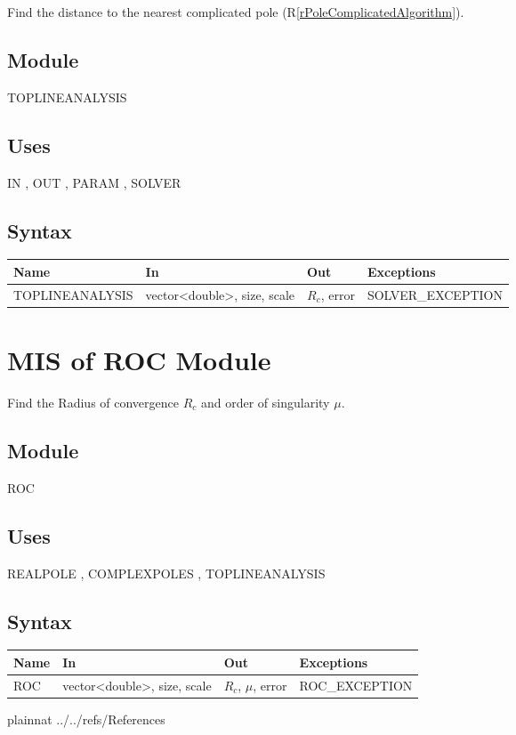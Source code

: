 \documentclass[12pt, titlepage]{article}
\newcommand{\rref}[1]{(R\ref{#1})}
\begin{document}
Find the distance to the nearest complicated pole \rref{rPoleComplicatedAlgorithm}.

\subsection{Module}

TOPLINEANALYSIS

\subsection{Uses}

IN , OUT , PARAM , SOLVER 

\subsection{Syntax}

\begin{tabular}{p{4cm} p{5cm} p{3cm} >{\raggedright\arraybackslash}p{5cm}}
\toprule
\textbf{Name} & \textbf{In} & \textbf{Out} & \textbf{Exceptions} \\
\midrule
  TOPLINEANALYSIS & vector<double>, size, scale &  $R_c$, error & SOLVER\_EXCEPTION \\
\bottomrule
\end{tabular}

\section{MIS of ROC Module} \label{sc:MIS_ROC}

Find the Radius of convergence $R_c$ and order of singularity $\mu$.

\subsection{Module}

ROC

\subsection{Uses}

REALPOLE ,
COMPLEXPOLES ,
TOPLINEANALYSIS 

\subsection{Syntax}

\begin{tabular}{p{3cm} p{5cm} p{3cm} >{\raggedright\arraybackslash}p{5cm}}
\toprule
\textbf{Name} & \textbf{In} & \textbf{Out} & \textbf{Exceptions} \\
\midrule
  ROC & vector<double>, size, scale &  $R_c$, $\mu$, error & ROC\_EXCEPTION \\
\bottomrule
\end{tabular}

 {plainnat}
 {../../refs/References}
\end{document}
